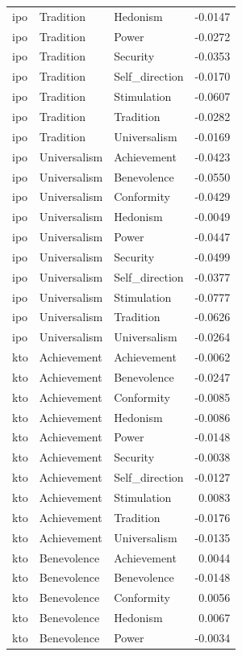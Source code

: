 \begin{tabular}{lllr}
ipo & Tradition & Hedonism & -0.0147 \\
ipo & Tradition & Power & -0.0272 \\
ipo & Tradition & Security & -0.0353 \\
ipo & Tradition & Self\_direction & -0.0170 \\
ipo & Tradition & Stimulation & -0.0607 \\
ipo & Tradition & Tradition & -0.0282 \\
ipo & Tradition & Universalism & -0.0169 \\
ipo & Universalism & Achievement & -0.0423 \\
ipo & Universalism & Benevolence & -0.0550 \\
ipo & Universalism & Conformity & -0.0429 \\
ipo & Universalism & Hedonism & -0.0049 \\
ipo & Universalism & Power & -0.0447 \\
ipo & Universalism & Security & -0.0499 \\
ipo & Universalism & Self\_direction & -0.0377 \\
ipo & Universalism & Stimulation & -0.0777 \\
ipo & Universalism & Tradition & -0.0626 \\
ipo & Universalism & Universalism & -0.0264 \\
kto & Achievement & Achievement & -0.0062 \\
kto & Achievement & Benevolence & -0.0247 \\
kto & Achievement & Conformity & -0.0085 \\
kto & Achievement & Hedonism & -0.0086 \\
kto & Achievement & Power & -0.0148 \\
kto & Achievement & Security & -0.0038 \\
kto & Achievement & Self\_direction & -0.0127 \\
kto & Achievement & Stimulation & 0.0083 \\
kto & Achievement & Tradition & -0.0176 \\
kto & Achievement & Universalism & -0.0135 \\
kto & Benevolence & Achievement & 0.0044 \\
kto & Benevolence & Benevolence & -0.0148 \\
kto & Benevolence & Conformity & 0.0056 \\
kto & Benevolence & Hedonism & 0.0067 \\
kto & Benevolence & Power & -0.0034 \\

\end{tabular}
